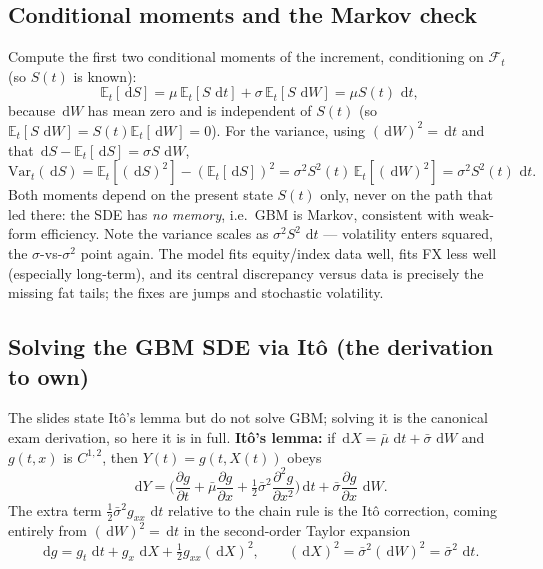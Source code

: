 \documentclass[11pt]{article}
\newcommand{\E}{\mathbb{E}}
\newcommand{\dd}{\,\mathrm{d}}
\begin{document}
\subsection{Conditional moments and the Markov check}

Compute the first two conditional moments of the increment, conditioning on $\mathcal{F}_t$ (so $S(t)$ is known):
\[
\E_t[\dd S]=\mu\,\E_t[S\,\dd t]+\sigma\,\E_t[S\,\dd W]=\mu S(t)\,\dd t,
\]
because $\dd W$ has mean zero and is independent of $S(t)$ (so $\E_t[S\,\dd W]=S(t)\E_t[\dd W]=0$). For the variance, using $(\dd W)^2=\dd t$ and that $\dd S-\E_t[\dd S]=\sigma S\,\dd W$,
\[
\mathrm{Var}_t(\dd S)=\E_t[(\dd S)^2]-(\E_t[\dd S])^2=\sigma^2 S^2(t)\,\E_t[(\dd W)^2]=\sigma^2 S^2(t)\,\dd t.
\]
Both moments depend on the present state $S(t)$ only, never on the path that led there: the SDE has \emph{no memory}, i.e.\ GBM is Markov, consistent with weak-form efficiency. Note the variance scales as $\sigma^2 S^2\,\dd t$ --- volatility enters squared, the $\sigma$-vs-$\sigma^2$ point again. The model fits equity/index data well, fits FX less well (especially long-term), and its central discrepancy versus data is precisely the missing fat tails; the fixes are jumps and stochastic volatility.

\subsection{Solving the GBM SDE via It\^o (the derivation to own)}

The slides state It\^o's lemma but do not solve GBM; solving it is the canonical exam derivation, so here it is in full. \textbf{It\^o's lemma:} if $\dd X=\bar\mu\,\dd t+\bar\sigma\,\dd W$ and $g(t,x)$ is $C^{1,2}$, then $Y(t)=g(t,X(t))$ obeys
\[
\dd Y=\Big(\frac{\partial g}{\partial t}+\bar\mu\frac{\partial g}{\partial x}+\tfrac12\bar\sigma^2\frac{\partial^2 g}{\partial x^2}\Big)\dd t+\bar\sigma\frac{\partial g}{\partial x}\,\dd W.
\]
The extra term $\tfrac12\bar\sigma^2 g_{xx}\,\dd t$ relative to the chain rule is the It\^o correction, coming entirely from $(\dd W)^2=\dd t$ in the second-order Taylor expansion
\[
\dd g=g_t\,\dd t+g_x\,\dd X+\tfrac12 g_{xx}(\dd X)^2,\qquad (\dd X)^2=\bar\sigma^2(\dd W)^2=\bar\sigma^2\,\dd t.
\]
\end{document}
